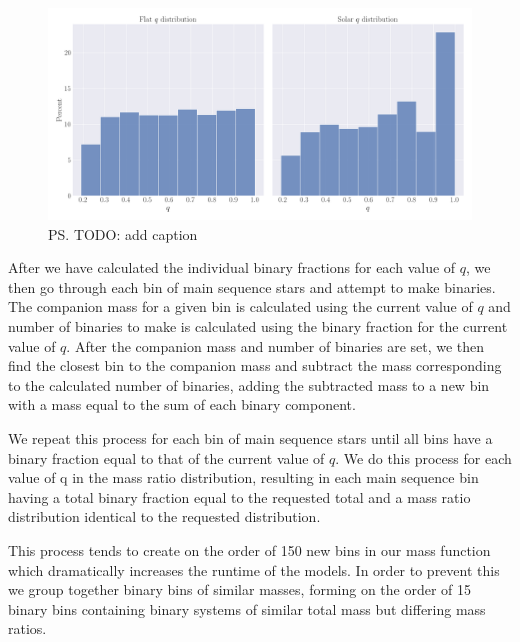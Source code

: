 \begin{figure}
	\centering
	\includegraphics[width=\textwidth]{figures/q-dists.png}
	\caption{\ps{TODO: add caption}}
	\label{fig:2/q-dists}
\end{figure}


After we have calculated the individual binary fractions for each value of $q$, we then go through
each bin of main sequence stars and attempt to make binaries. The companion mass for a given bin is
calculated using the current value of $q$ and number of binaries to make is calculated using the
binary fraction for the current value of $q$. After the companion mass and number of binaries are
set, we then find the closest bin to the companion mass and subtract the mass corresponding to the
calculated number of binaries, adding the subtracted mass to a new bin with a mass equal to the sum
of each binary component.


We repeat this process for each bin of main sequence stars until all bins have a binary fraction
equal to that of the current value of $q$. We do this process for each value of q in the mass ratio
distribution, resulting in each main sequence bin having a total binary fraction equal to the
requested total and a mass ratio distribution identical to the requested distribution.


This process tends to create on the order of 150 new bins in our mass function which dramatically
increases the runtime of the  models. In order to prevent this we group together binary
bins of similar masses, forming on the order of 15 binary bins containing binary systems of similar
total mass but differing mass ratios.


